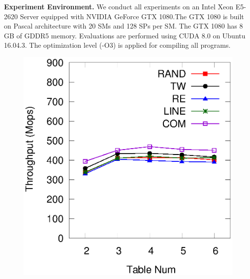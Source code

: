 \vspace{1mm}\noindent\textbf{Experiment Environment.}
We conduct all experiments on an Intel Xeon E5-2620 Server equipped with NVIDIA GeForce GTX 1080.The GTX 1080 is built on Pascal architecture with 20 SMs and 128 SPs per SM. The GTX 1080 has 8 GB of GDDR5 memory. Evaluations are performed using CUDA 8.0 on Ubuntu 16.04.3. The optimization level (-O3) is applied for compiling all programs.



\begin{figure}[t]
	\begin{minipage}{0.48\linewidth}\centering
		\includegraphics[width=\linewidth]{pic/tunning/tunning-insert.eps}
		\centerline{}
	\end{minipage}
	\hfill
	\begin{minipage}{0.48\linewidth}\centering

\end{minipage}
\end{figure}
